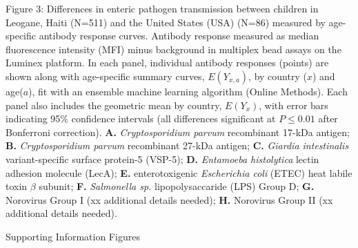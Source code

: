 \documentclass[11pt]{article}
\begin{document}
\clearpage
Figure 3: Differences in enteric pathogen transmission between children in Leogane, Haiti (N=511) and the United States (USA) (N=86) measured by age-specific antibody response curves. Antibody response measured as median fluorescence intensity (MFI) minus background in multiplex bead assays on the Luminex platform. In each panel, individual antibody responses (points) are shown along with age-specific summary curves, $E(Y_{x,a})$, by country ($x$) and age($a$), fit with an ensemble machine learning algorithm (Online Methods). Each panel also includes the geometric mean by country, $E(Y_{x})$, with error bars indicating 95\% confidence intervals (all differences significant at $P\leq0.01$ after Bonferroni correction).
\textbf{A.} \textit{Cryptosporidium parvum} recombinant 17-kDa antigen;
\textbf{B.} \textit{Cryptosporidium parvum} recombinant 27-kDa antigen;
\textbf{C.} \textit{Giardia intestinalis} variant-specific surface protein-5 (VSP-5);
\textbf{D.} \textit{Entamoeba histolytica} lectin adhesion molecule (LecA);
\textbf{E.} enterotoxigenic \textit{Escherichia coli} (ETEC) heat labile toxin $\beta$ subunit;
\textbf{F.} \textit{Salmonella sp.} lipopolysaccaride (LPS) Group D;
\textbf{G.} Norovirus Group I (xx additional details needed);
\textbf{H.} Norovirus Group II (xx additional details needed).

\clearpage
\begin{center}
{\Large Supporting Information Figures}
\end{center}
\end{document}
